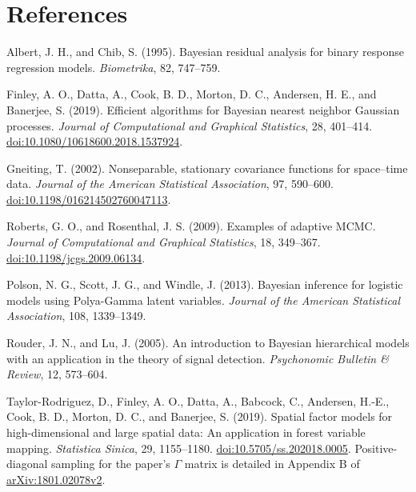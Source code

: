 \documentclass[11pt]{article}
\begin{document}
\section*{References}

Albert, J. H., and Chib, S. (1995). Bayesian residual analysis for binary
response regression models. \emph{Biometrika}, 82, 747--759.

Finley, A. O., Datta, A., Cook, B. D., Morton, D. C., Andersen, H. E., and
Banerjee, S. (2019). Efficient algorithms for Bayesian nearest neighbor Gaussian
processes. \emph{Journal of Computational and Graphical Statistics}, 28, 401--414.
\href{https://doi.org/10.1080/10618600.2018.1537924}{doi:10.1080/10618600.2018.1537924}.

Gneiting, T. (2002). Nonseparable, stationary covariance functions for
space--time data. \emph{Journal of the American Statistical Association},
97, 590--600. \href{https://doi.org/10.1198/016214502760047113}{doi:10.1198/016214502760047113}.

Roberts, G. O., and Rosenthal, J. S. (2009). Examples of adaptive MCMC.
\emph{Journal of Computational and Graphical Statistics}, 18, 349--367.
\href{https://doi.org/10.1198/jcgs.2009.06134}{doi:10.1198/jcgs.2009.06134}.

Polson, N. G., Scott, J. G., and Windle, J. (2013). Bayesian inference for
logistic models using Polya-Gamma latent variables. \emph{Journal of the
American Statistical Association}, 108, 1339--1349.

Rouder, J. N., and Lu, J. (2005). An introduction to Bayesian hierarchical
models with an application in the theory of signal detection. \emph{Psychonomic
Bulletin \& Review}, 12, 573--604.

Taylor-Rodriguez, D., Finley, A. O., Datta, A., Babcock, C., Andersen, H.-E.,
Cook, B. D., Morton, D. C., and Banerjee, S. (2019). Spatial factor models for
high-dimensional and large spatial data: An application in forest variable
mapping. \emph{Statistica Sinica}, 29, 1155--1180.
\href{https://doi.org/10.5705/ss.202018.0005}{doi:10.5705/ss.202018.0005}.
Positive-diagonal sampling for the paper's \(\Gamma\) matrix is detailed in Appendix B
of \href{https://arxiv.org/abs/1801.02078v2}{arXiv:1801.02078v2}.
\end{document}
